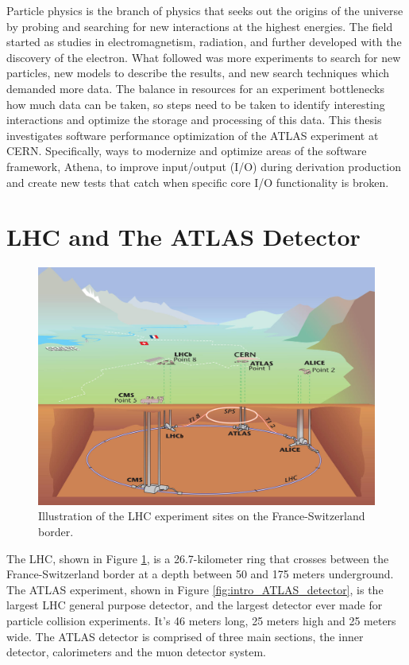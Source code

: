 Particle physics is the branch of physics that seeks out the origins of the universe by probing and searching for new interactions at the highest energies. 
The field started as studies in electromagnetism, radiation, and further developed with the discovery of the electron.
What followed was more experiments to search for new particles, new models to describe the results, and new search techniques which demanded more data.
The balance in resources for an experiment bottlenecks how much data can be taken, so steps need to be taken to identify interesting interactions and optimize the storage and processing of this data.
This thesis investigates software performance optimization of the ATLAS experiment at CERN. 
Specifically, ways to modernize and optimize areas of the software framework, Athena, to improve input/output (I/O) during derivation production and create new tests that catch when specific core I/O functionality is broken.

\section{LHC and The ATLAS Detector}

\begin{figure}[h]
    \centering
    \includegraphics[width=.8\textwidth]{content/img/LHC illustration.jpg}
    \caption{Illustration of the LHC experiment sites on the France-Switzerland border. \cite{LHC_Illustration}}
    \label{fig:intro_LHC_sites}
\end{figure}

The LHC, shown in Figure \ref{fig:intro_LHC_sites},  is a 26.7-kilometer ring that crosses between the France-Switzerland border at a depth between 50 and 175 meters underground.\cite{LHC_faq_guide}
The ATLAS experiment, shown in Figure \ref{fig:intro_ATLAS_detector}, is the largest LHC general purpose detector, and the largest detector ever made for particle collision experiments. 
It's 46 meters long, 25 meters high and 25 meters wide.\cite{ATLAS_Fact_Sheet}
The ATLAS detector is comprised of three main sections, the inner detector, calorimeters and the muon detector system. 


